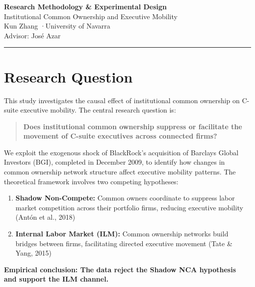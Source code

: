 \documentclass[11pt,a4paper]{article}
\begin{document}
\begin{center}
{\LARGE\bfseries\color{headcolor} Research Methodology \& Experimental Design}\\[0.5cm]
{\large Institutional Common Ownership and Executive Mobility}\\[0.3cm]
{\normalsize Kun Zhang \quad·\quad University of Navarra}\\[0.2cm]
{\normalsize Advisor: Jos\'{e} Azar}
\end{center}
\vspace{-0.3cm}
\rule{\textwidth}{0.4pt}

\tableofcontents
\newpage

\section{Research Question}

This study investigates the causal effect of institutional common ownership on C-suite executive mobility. The central research question is:

\begin{quote}
{\bf Does institutional common ownership suppress or facilitate the movement of C-suite executives across connected firms?}
\end{quote}

We exploit the exogenous shock of BlackRock's acquisition of Barclays Global Investors (BGI), completed in December 2009, to identify how changes in common ownership network structure affect executive mobility patterns. The theoretical framework involves two competing hypotheses:

\begin{enumerate}[leftmargin=*]
  \item {\bf Shadow Non-Compete:} Common owners coordinate to suppress labor market competition across their portfolio firms, reducing executive mobility (Ant\'{o}n et al., 2018)
  \item {\bf Internal Labor Market (ILM):} Common ownership networks build bridges between firms, facilitating directed executive movement (Tate \& Yang, 2015)
\end{enumerate}

{\color{red}\bf Empirical conclusion: The data reject the Shadow NCA hypothesis and support the ILM channel.}

\newpage
\end{document}

